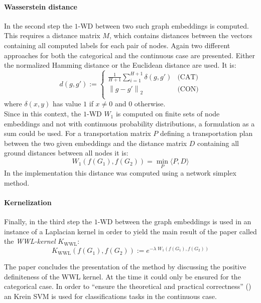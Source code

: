 \documentclass[twoside,twocolumn]{scrartcl}
\newcommand{\norm}[1]{\left\lVert#1\right\rVert}
\begin{document}
\paragraph{Wasserstein distance}
In the second step the $1$-WD between two such graph embeddings is computed.\\
This requires a distance matrix $M$, which contains distances between the vectors containing all computed labels for each pair of nodes. Again two different approaches for both the categorical and the continuous case are presented. Either the normalized Hamming distance or the Euclidean distance are used. It is:
\[ d(g, g') := \begin{cases}
\frac{1}{H+1}\sum\limits_{i=1}^{H+1} \delta(g, g') & \text{(CAT)}\\ 
\norm{g-g'}_2  & \text{(CON)}\\ 
\end{cases} \]
where $\delta(x,y)$ has value $1$ if $x\neq 0$ and $0$ otherwise.\\
Since in this context, the $1$-WD $W_1$ is computed on finite sets of node embeddings and not with continuous probability distributions, a formulation as a sum could be used. For a transportation matrix $P$ defining a transportation plan between the two given embeddings and the distance matrix $D$ containing all ground distances between all nodes it is:
\[ W_1(f(G_1),f(G_2))= \min\limits_{P}\langle P,D\rangle \]
In the implementation this distance was computed using a network simplex method.

\paragraph{Kernelization}
Finally, in the third step the $1$-WD between the graph embeddings is used in an instance of a Laplacian kernel in order to yield the main result of the paper called the \textit{WWL-kernel} $K_{\text{WWL}}$:
\[ K_{\text{WWL}}(f(G_1), f(G_2)) := e^{-\lambda\; W_1(f(G_1), f(G_2))} \]

The paper concludes the presentation of the method by discussing the positive definiteness of the WWL kernel. At the time it could only be ensured for the categorical case. In order to \enquote{ensure the theoretical and practical correctness} (\cite{A}) an Krein SVM is used for classifications tasks in the continuous case.
\end{document}
